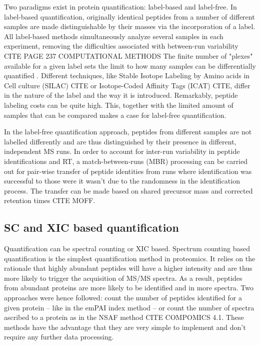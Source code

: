 \documentclass[11pt, a4paper]{report}
\begin{document}
Two paradigms exist in protein quantification: label-based and label-free. In label-based quantification, originally identical peptides from a number of different samples are made distinguishable by their masses via the incorporation of a label. All label-based methods simultaneously analyze several samples in each experiment, removing the difficulties associated with between-run variability \cite{Barsnes2008} CITE PAGE 237 COMPUTATIONAL METHODS The finite number of "plexes" available for a given label sets the limit to how many samples can be differentially quantified \cite{Cox2014}. Different techniques, like Stable Isotope Labeling by Amino acids in Cell culture (SILAC) CITE or Isotope-Coded Affinity Tags (ICAT) CITE, differ in the nature of the label and the way it is introduced. Remarkably, peptide labeling costs can be quite high. This, together with the limited amount of samples that can be compared makes a case for label-free quantification.

In the label-free quantification approach, peptides from different samples are not labelled differently and are thus distinguished by their presence in different, independent \ac{MS} runs. In order to account for inter-run variability in peptide identifications and \ac{RT}, a match-between-runs (MBR) processing can be carried out for pair-wise transfer of peptide identities from runs where identification was successful to those were it wasn't due to the randomness in the identification process. The transfer can be made based on shared precursor mass and corrected retention times CITE MOFF.

\subsection{SC and XIC based quantification}
\label{subsec:scvsxic}


Quantification can be spectral counting or \ac{XIC} based.
Spectrum counting based quantification is the simplest quantification method in proteomics. It relies on the rationale that highly abundant peptides will have a higher intensity and are thus more likely to trigger the acquisition of MS/MS spectra. As a result, peptides from abundant proteins are more likely to be
identified and in more spectra. Two approaches were hence followed: count the number of peptides identified for a given protein – like in the emPAI index method – or count the number of spectra ascribed to a protein as in the NSAF method CITE COMPOMICS 4.1. These methods have the advantage that they are very simple to implement and don't require any further data processing.
\end{document}
